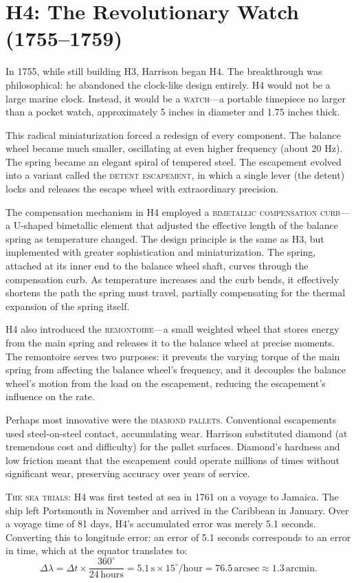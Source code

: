 \section{H4: The Revolutionary Watch (1755--1759)}

In 1755, while still building H3, Harrison began H4. The breakthrough was philosophical: he abandoned the clock-like design entirely. H4 would not be a large marine clock. Instead, it would be a \textsc{watch}—a portable timepiece no larger than a pocket watch, approximately 5 inches in diameter and 1.75 inches thick.

This radical miniaturization forced a redesign of every component. The balance wheel became much smaller, oscillating at even higher frequency (about 20 Hz). The spring became an elegant spiral of tempered steel. The escapement evolved into a variant called the \textsc{detent escapement}, in which a single lever (the detent) locks and releases the escape wheel with extraordinary precision.

The compensation mechanism in H4 employed a \textsc{bimetallic compensation curb}—a U-shaped bimetallic element that adjusted the effective length of the balance spring as temperature changed. The design principle is the same as H3, but implemented with greater sophistication and miniaturization. The spring, attached at its inner end to the balance wheel shaft, curves through the compensation curb. As temperature increases and the curb bends, it effectively shortens the path the spring must travel, partially compensating for the thermal expansion of the spring itself.

H4 also introduced the \textsc{remontoire}—a small weighted wheel that stores energy from the main spring and releases it to the balance wheel at precise moments. The remontoire serves two purposes: it prevents the varying torque of the main spring from affecting the balance wheel's frequency, and it decouples the balance wheel's motion from the load on the escapement, reducing the escapement's influence on the rate.

Perhaps most innovative were the \textsc{diamond pallets}. Conventional escapements used steel-on-steel contact, accumulating wear. Harrison substituted diamond (at tremendous cost and difficulty) for the pallet surfaces. Diamond's hardness and low friction meant that the escapement could operate millions of times without significant wear, preserving accuracy over years of service.

\textsc{The sea trials:} H4 was first tested at sea in 1761 on a voyage to Jamaica. The ship left Portsmouth in November and arrived in the Caribbean in January. Over a voyage time of 81 days, H4's accumulated error was merely 5.1 seconds. Converting this to longitude error: an error of 5.1 seconds corresponds to an error in time, which at the equator translates to:
\[
  \Delta\lambda = \Delta t \times \frac{360^{\circ}}{24 \, \text{hours}} = 5.1 \, \text{s} \times 15^{\circ}/\text{hour} = 76.5 \, \text{arcsec} \approx 1.3 \, \text{arcmin}.
\]

